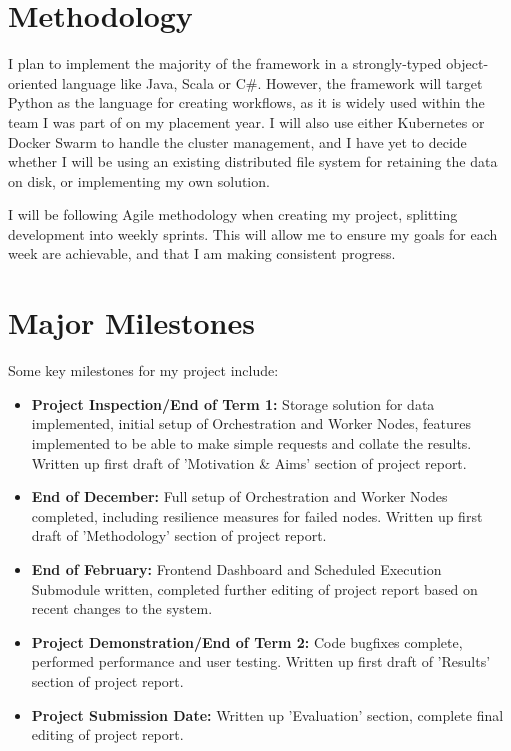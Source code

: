 \documentclass[12pt]{article}
\begin{document}
	\section{Methodology}
	I plan to implement the majority of the framework in a strongly-typed object-oriented language like Java, Scala or C\#. However, the framework will target Python as the language for creating workflows, as it is widely used within the team I was part of on my placement year. I will also use either Kubernetes or Docker Swarm to handle the cluster management, and I have yet to decide whether I will be using an existing distributed file system for retaining the data on disk, or implementing my own solution. \medskip
	
	I will be following Agile methodology when creating my project, splitting development into weekly sprints. This will allow me to ensure my goals for each week are achievable, and that I am making consistent progress.
	
	\section{Major Milestones}
	Some key milestones for my project include:
	\begin{itemize}
		\item \textbf{Project Inspection/End of Term 1:} Storage solution for data implemented, initial setup of Orchestration and Worker Nodes, features implemented to be able to make simple requests and collate the results. Written up first draft of 'Motivation \& Aims' section of project report.
		\item \textbf{End of December:} Full setup of Orchestration and Worker Nodes completed, including resilience measures for failed nodes. Written up first draft of 'Methodology' section of project report.
		\item \textbf{End of February:} Frontend Dashboard and Scheduled Execution Submodule written, completed further editing of project report based on recent changes to the system.
		\item \textbf{Project Demonstration/End of Term 2:} Code bugfixes complete, performed performance and user testing. Written up first draft of 'Results' section of project report.
		\item \textbf{Project Submission Date:} Written up 'Evaluation' section, complete final editing of project report.
	\end{itemize}
	
	
\end{document}
